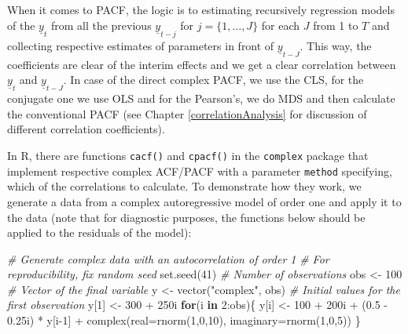 \documentclass[
]{book}
\newenvironment{Shaded}{\begin{snugshade}}{\end{snugshade}}
\newcommand{\AttributeTok}[1]{\textcolor[rgb]{0.77,0.63,0.00}{#1}}
\newcommand{\CommentTok}[1]{\textcolor[rgb]{0.56,0.35,0.01}{\textit{#1}}}
\newcommand{\ControlFlowTok}[1]{\textcolor[rgb]{0.13,0.29,0.53}{\textbf{#1}}}
\newcommand{\DecValTok}[1]{\textcolor[rgb]{0.00,0.00,0.81}{#1}}
\newcommand{\FloatTok}[1]{\textcolor[rgb]{0.00,0.00,0.81}{#1}}
\newcommand{\FunctionTok}[1]{\textcolor[rgb]{0.00,0.00,0.00}{#1}}
\newcommand{\NormalTok}[1]{#1}
\newcommand{\OtherTok}[1]{\textcolor[rgb]{0.56,0.35,0.01}{#1}}
\newcommand{\SpecialCharTok}[1]{\textcolor[rgb]{0.00,0.00,0.00}{#1}}
\newcommand{\StringTok}[1]{\textcolor[rgb]{0.31,0.60,0.02}{#1}}
\begin{document}
When it comes to PACF, the logic is to estimating recursively regression models of the \(\underline{y}_{t}\) from all the previous \(\underline{y}_{t-j}\) for \(j=\{1, \dots, J\}\) for each \(J\) from 1 to \(T\) and collecting respective estimates of parameters in front of \(\underline{y}_{t-J}\). This way, the coefficients are clear of the interim effects and we get a clear correlation between \(\underline{y}_{t}\) and \(\underline{y}_{t-J}\). In case of the direct complex PACF, we use the CLS, for the conjugate one we use OLS and for the Pearson's, we do MDS and then calculate the conventional PACF (see Chapter \ref{correlationAnalysis} for discussion of different correlation coefficients).

In R, there are functions \texttt{cacf()} and \texttt{cpacf()} in the \texttt{complex} package that implement respective complex ACF/PACF with a parameter \texttt{method} specifying, which of the correlations to calculate. To demonstrate how they work, we generate a data from a complex autoregressive model of order one and apply it to the data (note that for diagnostic purposes, the functions below should be applied to the residuals of the model):

\begin{Shaded}
\begin{Highlighting}[]
\CommentTok{\# Generate complex data with an autocorrelation of order 1}
\CommentTok{\# For reproducibility, fix random seed}
\FunctionTok{set.seed}\NormalTok{(}\DecValTok{41}\NormalTok{)}
\CommentTok{\# Number of observations}
\NormalTok{obs }\OtherTok{\textless{}{-}} \DecValTok{100}
\CommentTok{\# Vector of the final variable}
\NormalTok{y }\OtherTok{\textless{}{-}} \FunctionTok{vector}\NormalTok{(}\StringTok{"complex"}\NormalTok{, obs)}
\CommentTok{\# Initial values for the first observation}
\NormalTok{y[}\DecValTok{1}\NormalTok{] }\OtherTok{\textless{}{-}} \DecValTok{300} \SpecialCharTok{+}\NormalTok{ 250i}
\ControlFlowTok{for}\NormalTok{(i }\ControlFlowTok{in} \DecValTok{2}\SpecialCharTok{:}\NormalTok{obs)\{}
\NormalTok{    y[i] }\OtherTok{\textless{}{-}} \DecValTok{100} \SpecialCharTok{+}\NormalTok{ 200i }\SpecialCharTok{+}\NormalTok{ (}\FloatTok{0.5} \SpecialCharTok{{-}} \FloatTok{0.25}\NormalTok{i) }\SpecialCharTok{*}\NormalTok{ y[i}\DecValTok{{-}1}\NormalTok{] }\SpecialCharTok{+}
        \FunctionTok{complex}\NormalTok{(}\AttributeTok{real=}\FunctionTok{rnorm}\NormalTok{(}\DecValTok{1}\NormalTok{,}\DecValTok{0}\NormalTok{,}\DecValTok{10}\NormalTok{), }\AttributeTok{imaginary=}\FunctionTok{rnorm}\NormalTok{(}\DecValTok{1}\NormalTok{,}\DecValTok{0}\NormalTok{,}\DecValTok{5}\NormalTok{))}
\NormalTok{\}}
\end{Highlighting}
\end{Shaded}
\end{document}
